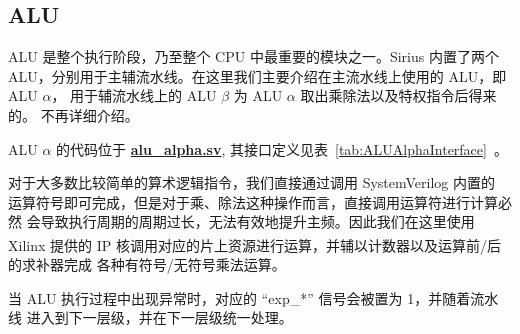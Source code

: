 \documentclass[blue,normal,cn,hide]{elegantbook}
\begin{document}
\subsection{ALU}

ALU 是整个执行阶段，乃至整个 CPU 中最重要的模块之一。Sirius 内置了两个
ALU，分别用于主辅流水线。在这里我们主要介绍在主流水线上使用的 ALU，即 ALU $\alpha$，
用于辅流水线上的 ALU $\beta$ 为 ALU $\alpha$ 取出乘除法以及特权指令后得来的。
不再详细介绍。

ALU $\alpha$ 的代码位于 \href{https://github.com/name1e5s/Sirius/blob/master/alu\_alpha.sv}{\textbf{alu\_alpha.sv}},
其接口定义见表~\ref{tab:ALUAlphaInterface}~。

对于大多数比较简单的算术逻辑指令，我们直接通过调用 SystemVerilog 内置的
运算符号即可完成，但是对于乘、除法这种操作而言，直接调用运算符进行计算必然
会导致执行周期的周期过长，无法有效地提升主频。因此我们在这里使用 Xilinx\textsuperscript{\textregistered}
提供的 IP 核调用对应的片上资源进行运算，并辅以计数器以及运算前/后的求补器完成
各种有符号/无符号乘法运算。

当 ALU 执行过程中出现异常时，对应的 ``exp\_*'' 信号会被置为 1，并随着流水线
进入到下一层级，并在下一层级统一处理。
\end{document}
